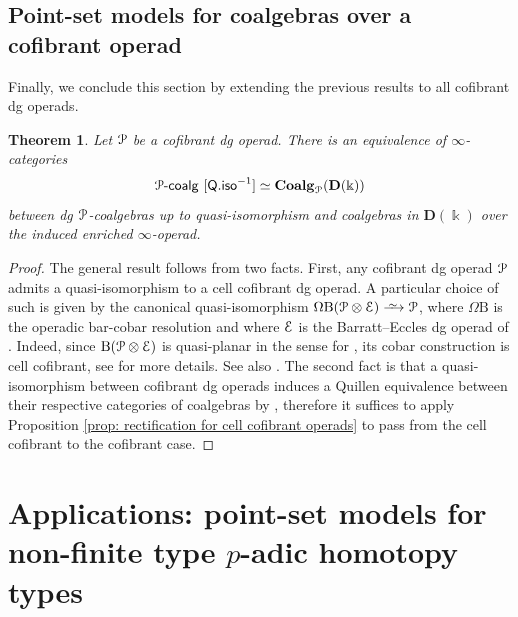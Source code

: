 \documentclass[a4paper,12pt]{amsart}
\renewcommand{\mathcal}{\EuScript}
\theoremstyle{plain}
\newtheorem{theorem}{Theorem}[section]
\theoremstyle{definition}
\theoremstyle{remark}
\newcommand{\qi}{\xrightarrow{ \,\smash{\raisebox{-0.65ex}{\ensuremath{\scriptstyle\sim}}}\,}}
\newcommand{\kk}{\Bbbk}
\begin{document}
\subsection{Point-set models for coalgebras over a cofibrant operad}

Finally, we conclude this section by extending the previous results to all cofibrant dg operads. 

\begin{theorem}\label{thm: rectification for cofibrant operads}
Let $\mathcal{P}$ be a cofibrant dg operad. There is an equivalence of $\infty$-categories
\[
\mathcal{P}\text{-}\mathsf{coalg}~[\mathsf{Q.iso}^{-1}] \simeq \mathbf{Coalg}_{\mathcal{P}}(\mathbf{D}(\kk))
\]
between dg $\mathcal{P}$-coalgebras up to quasi-isomorphism and coalgebras in $\mathbf{D}(\kk)$ over the induced enriched $\infty$-operad. 
\end{theorem}

\begin{proof}
The general result follows from two facts. First, any cofibrant dg operad $\mathcal{P}$ admits a quasi-isomorphism to a cell cofibrant dg operad. A particular choice of such is given by the canonical quasi-isomorphism $\Omega\mathrm{B}(\mathcal{P} \otimes \mathcal{E}) \qi \mathcal{P}$, where $\Omega\mathrm{B}$ is the operadic bar-cobar resolution and where $\mathcal{E}$ is the Barratt--Eccles dg operad of \cite{BergerFresse}. Indeed, since $\mathrm{B}(\mathcal{P} \otimes \mathcal{E})$ is quasi-planar in the sense for \cite{premierpapier}, its cobar construction is cell cofibrant, see \cite[Proposition 9 and 11]{premierpapier} for more details. See also \cite{BergerMoerdijk06}. The second fact is that a quasi-isomorphism between cofibrant dg operads induces a Quillen equivalence between their respective categories of coalgebras by \cite[Proposition 31]{premierpapier}, therefore it suffices to apply Proposition \ref{prop: rectification for cell cofibrant operads} to pass from the cell cofibrant to the cofibrant case. 
\end{proof}

\vspace{1pc}

\section{Applications: point-set models for non-finite type \texorpdfstring{$p$}{p}-adic homotopy types}

\vspace{2.5pc}
\end{document}
